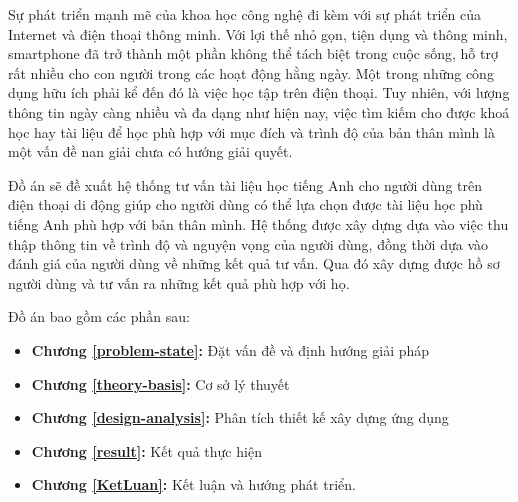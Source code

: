  
\begin{abstracts}         

Sự phát triển mạnh mẽ của khoa học công nghệ đi kèm với sự phát triển của Internet và điện thoại thông minh. Với lợi thế nhỏ gọn, tiện dụng và thông minh, smartphone đã trở thành một phần không thể tách biệt trong cuộc sống, hỗ trợ rất nhiều cho con người trong các hoạt động hằng ngày. Một trong những công dụng hữu ích phải kể đến đó là việc học tập trên điện thoại. Tuy nhiên, với lượng thông tin ngày càng nhiều và đa dạng như hiện nay, việc tìm kiếm cho được khoá học hay tài liệu để học phù hợp với mục đích và trình độ của bản thân mình là một vấn đề nan giải chưa có hướng giải quyết.

Đồ án sẽ đề xuất hệ thống tư vấn tài liệu học tiếng Anh cho người dùng trên điện thoại di động giúp cho người dùng có thể lựa chọn được tài liệu học phù tiếng Anh phù hợp với bản thân mình. Hệ thống được xây dựng dựa vào việc thu thập thông tin về trình độ và nguyện vọng của người dùng, đồng thời dựa vào đánh giá của người dùng về những kết quả tư vấn. Qua đó xây dựng được hồ sơ người dùng và tư vấn ra những kết quả phù hợp với họ.

\textbf{ }
		
Đồ án bao gồm các phần sau:
\begin{itemize}
\item \textbf{Chương \ref{problem-state}:}  Đặt vấn đề và định hướng giải pháp
\item \textbf{Chương \ref{theory-basis}:}  Cơ sở lý thuyết
\item \textbf{Chương \ref{design-analysis}:} Phân tích thiết kế xây dựng ứng dụng
\item \textbf{Chương \ref{result}:} Kết quả thực hiện
\item \textbf{Chương \ref{KetLuan}:} Kết luận và hướng phát triển.
\end{itemize}
\end{abstracts}